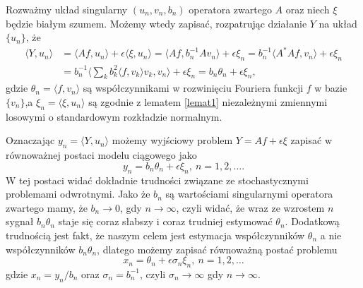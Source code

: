 \documentclass[man,mfiu]{mgrwms}
\begin{document}
Rozważmy układ singularny $(u_n,v_n,b_n)$ operatora zwartego $A$ oraz niech $\xi$ będzie białym szumem. Możemy wtedy zapisać, rozpatrując działanie $Y$ na układ $\{u_n\}$, że
\begin{displaymath}
\begin{split}
\langle Y,u_n\rangle &=\langle Af,u_n\rangle +\epsilon\langle \xi, u_n\rangle=\langle Af,b_n^{-1}Av_n\rangle+\epsilon \xi_n=b_n^{-1}\langle A^*Af, v_n\rangle+\epsilon \xi_n\\
&=b_n^{-1}\langle \sum_kb_k^2\langle f, v_k\rangle v_k, v_n\rangle +\epsilon\xi_n=b_n\theta_n+\epsilon\xi_n,
\end{split}
\end{displaymath}
gdzie $\theta_n=\langle f,v_n\rangle$ są współczynnikami w rozwinięciu Fouriera funkcji $f$ w bazie $\{v_n\}$,a $\xi_n=\langle \xi, u_n\rangle$ są zgodnie z lematem \ref{lemat1} niezależnymi zmiennymi losowymi o standardowym rozkładzie normalnym.

Oznaczając $y_n=\langle Y,u_n\rangle$ możemy wyjściowy problem $Y=Af+\epsilon\xi$ zapisać w równoważnej postaci modelu ciągowego jako
\begin{displaymath}
y_n=b_n\theta_n+\epsilon\xi_n,\ n=1,2,\dots.
\end{displaymath}
W tej postaci widać dokładnie trudności związane ze stochastycznymi problemami odwrotnymi. Jako że $b_n$ są wartościami singularnymi operatora zwartego mamy, że $b_n\to 0$, gdy $n\to \infty$, czyli widać, że wraz ze wzrostem $n$ sygnał $b_n\theta_n$ staje się coraz słabszy i coraz trudniej estymować $\theta_n$. Dodatkową trudnością jest fakt, że naszym celem jest estymacja współczynników $\theta_n$ a nie współczynników $b_n\theta_n$, dlatego możemy zapisać równoważną postać problemu
\begin{equation}\label{ssm}
x_n=\theta_n+\epsilon\sigma_n\xi_n,\ n=1,2,\dots
\end{equation}
gdzie $x_n=y_n/b_n$ oraz $\sigma_n=b_n^{-1}$, czyli $\sigma_n\to \infty$ gdy $n\to \infty$. \\
\end{document}
